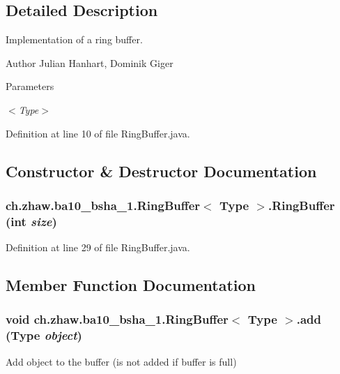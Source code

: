 \subsection{Detailed Description}
Implementation of a ring buffer.

\begin{DoxyAuthor}{Author}
Julian Hanhart, Dominik Giger 
\end{DoxyAuthor}

\begin{DoxyParams}{Parameters}
\item[{\em $<$Type$>$}]\end{DoxyParams}


Definition at line 10 of file RingBuffer.java.

\subsection{Constructor \& Destructor Documentation}
\hypertarget{classch_1_1zhaw_1_1ba10__bsha__1_1_1RingBuffer_3_01Type_01_4_ae1dfe88c3ce02a51d0f7cd05ea7adb25}{
\subsubsection[{RingBuffer}]{\setlength{\rightskip}{0pt plus 5cm}ch.zhaw.ba10\_\-bsha\_\-1.RingBuffer$<$ Type $>$.RingBuffer (int {\em size})}}
\label{classch_1_1zhaw_1_1ba10__bsha__1_1_1RingBuffer_3_01Type_01_4_ae1dfe88c3ce02a51d0f7cd05ea7adb25}


Definition at line 29 of file RingBuffer.java.

\subsection{Member Function Documentation}
\hypertarget{classch_1_1zhaw_1_1ba10__bsha__1_1_1RingBuffer_3_01Type_01_4_a21bbdf937d9882aa3bedaa12659f1473}{
\subsubsection[{add}]{\setlength{\rightskip}{0pt plus 5cm}void ch.zhaw.ba10\_\-bsha\_\-1.RingBuffer$<$ Type $>$.add (Type {\em object})}}
\label{classch_1_1zhaw_1_1ba10__bsha__1_1_1RingBuffer_3_01Type_01_4_a21bbdf937d9882aa3bedaa12659f1473}
Add object to the buffer (is not added if buffer is full)


